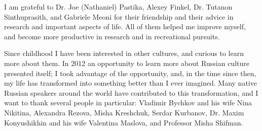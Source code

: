 I am grateful to Dr. Joe (Nathaniel) Pastika, Alexey Finkel, Dr. Tutanon Sinthuprasith, and Gabriele Meoni for their friendship 
and their advice in research and important aspects of life.  All of them helped me improve myself, and become more productive 
in research and in recreational pursuits.

Since childhood I have been interested in other cultures, and curious to learn more about them.  In 2012 an opportunity to 
learn more about Russian culture presented itself; I took advantage of the opportunity, and, in the time since then, my life 
has transformed into something better than I ever imagined.  Many native Russian speakers around the world have contributed 
to this transformation, and I want to thank several people in particular: Vladimir Bychkov and his wife Nina Nikitina, 
Alexandra Rezova, Misha Kreshchuk, Serdar Kurbanov, Dr. Maxim Konyushikhin and his wife Valentina Maslova, and Professor Misha 
Shifman.

